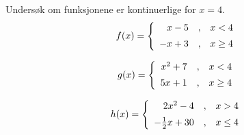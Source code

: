 





\opgt

Undersøk om funksjonene er kontinuerlige for $ x=4 $.
\begin{equation*}
	f(x)= \left\lbrace{
		\begin{array}{rcr}
			x-5 &,&x<4 \br
			-x+3   &,& x\geq 4
		\end{array}
	}\right. 
\end{equation*}

\begin{equation*}
	g(x)= \left\lbrace{
		\begin{array}{rcr}
			x^2+7 &,&x<4 \br
			5x+1   &,& x\geq 4
		\end{array}
	}\right. 
\end{equation*}

\begin{equation*}
	h(x)= \left\lbrace{
		\begin{array}{rcr}
			2x^2-4 &,&x>4 \br
			-\frac{1}{2}x+30   &,& x\leq 4
		\end{array}
	}\right. 
\end{equation*}

